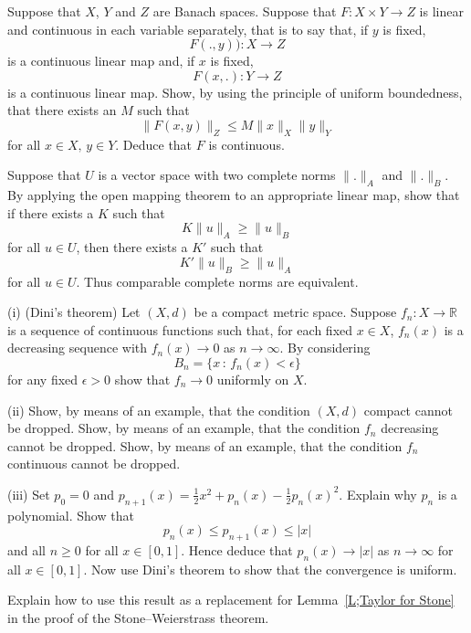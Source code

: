 \begin{exercise}\label{C1.10} Suppose that $X$, $Y$ and $Z$ are Banach spaces.
Suppose that $F:X\times Y\rightarrow Z$ is linear and continuous
in each variable separately,
that is to say that, if $y$ is fixed,
\[F(.,y)):X\rightarrow Z\]
is a continuous linear map and, if $x$ is fixed,
\[F(x,.):Y\rightarrow Z\]
is a continuous linear map. Show, by using the principle
of uniform boundedness, that there exists an $M$ such that
\[\|F(x,y)\|_{Z}\leq M\|x\|_{X}\|y\|_{Y}\]
for all $x\in X,\, y\in Y$. Deduce that
$F$ is continuous.
\end{exercise}
\begin{exercise}\label{E;equivalent norms}\label{C1.11} 
Suppose that $U$
is a vector space with two complete norms $\|.\|_{A}$ and
$\|.\|_{B}$. By applying the open mapping theorem to
an appropriate linear map, show that if there exists a $K$ such that
\[K \|u\|_{A}\geq  \|u\|_{B}\]
for all $u\in U$, then there exists a $K'$ such that
\[K' \|u\|_{B}\geq  \|u\|_{A}\]
for all $u\in U$. Thus comparable complete norms are equivalent.

\end{exercise}
\begin{exercise}\label{C1.12}  (i) (Dini's theorem) Let $(X,d)$ 
be a compact metric space. Suppose $f_{n}:X\rightarrow{\mathbb R}$
is a sequence of continuous functions such that,
for each fixed $x\in X$, $f_{n}(x)$ is a decreasing sequence
with $f_{n}(x)\rightarrow 0$ as $n\rightarrow\infty$.
By considering
\[B_{n}=\{x\,:\,f_{n}(x)<\epsilon\}\]
for any fixed $\epsilon>0$ show that $f_{n}\rightarrow 0$
uniformly on $X$.

(ii) Show, by means of an example,
that the condition $(X,d)$ compact cannot be dropped.
Show, by means of an example,
that the condition $f_{n}$ decreasing cannot be dropped.
Show, by means of an example,
that the condition $f_{n}$ continuous cannot be dropped.


(iii) Set $p_{0}=0$ and 
$p_{n+1}(x)=\tfrac{1}{2}x^{2}+p_{n}(x)-\tfrac{1}{2}p_{n}(x)^{2}$.
Explain why $p_{n}$ is a polynomial. Show that
\[p_{n}(x)\leq p_{n+1}(x)\leq |x|\]
and all $n\geq 0$ for all $x\in [0,1]$. 
Hence deduce 
that $p_{n}(x)\rightarrow |x|$ as $n\rightarrow\infty$ for all $x\in[0,1]$.
Now use Dini's theorem to show that the convergence is uniform.

Explain how to use this result as a replacement for
Lemma~\ref{L;Taylor for Stone} in the proof of the Stone--Weierstrass
theorem.
\end{exercise}
